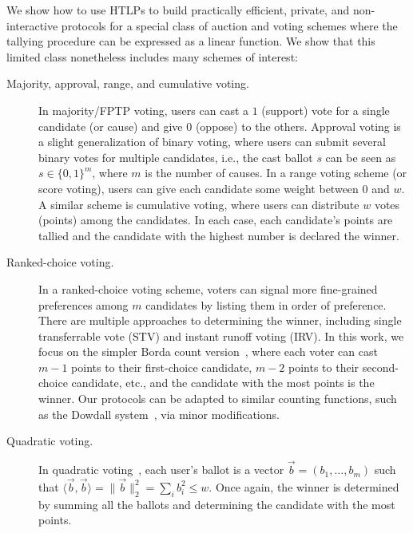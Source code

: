 We show how to use HTLPs to build practically efficient, private, and non-interactive protocols for a special class of auction and voting schemes where the tallying procedure can be expressed as a linear function. We show that this limited class nonetheless includes many schemes of interest:
\begin{description}
    \item[Majority, approval, range, and cumulative voting.] In majority/FPTP voting, users can cast a $1$ (support) vote for a single candidate (or cause) and give $0$ (oppose) to the others. Approval voting is a slight generalization of binary voting, where users can submit several binary votes for multiple candidates, i.e., the cast ballot $s$ can be seen as $s\in\{0,1\}^{m}$, where $m$ is the number of causes. In a range voting scheme (or score voting), users can give each candidate some weight between $0$ and $w$. A similar scheme is cumulative voting, where users can distribute $w$ votes (points) among the candidates. In each case, each candidate's points are tallied and the candidate with the highest number is declared the winner.
    \item[Ranked-choice voting.] In a ranked-choice voting scheme, voters can signal more fine-grained preferences among $m$ candidates by listing them in order of preference. There are multiple approaches to determining the winner, including single transferrable vote (STV) and instant runoff voting (IRV). In this work, we focus on the simpler Borda count version~\cite{Emerson13}, where each voter can cast $m-1$ points to their first-choice candidate, $m-2$ points to their second-choice candidate, etc., and the candidate with the most points is the winner. Our protocols can be adapted to similar counting functions, such as the Dowdall system~\cite{FraGro14}, via minor modifications.
    \item[Quadratic voting.] In quadratic voting~\cite{AEA:LalWey18}, each user's ballot is a vector $\vec{b} = (b_1, \dots, b_m)$ such that $\langle \vec{b}, \vec{b} \rangle = \lVert \vec{b} \rVert^2_2 = \sum_i b_i^2 \leq w$. Once again, the winner is determined by summing all the ballots and determining the candidate with the most points. 
\end{description}


